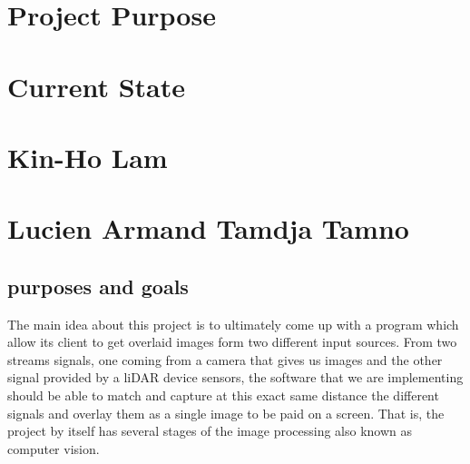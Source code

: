\documentclass[onecolumn, draftclsnofoot,10pt, compsoc]{IEEEtran}
\begin{document}
\begin{singlespace}

	\section{Project Purpose}
		
	\section{Current State}

	\section{Kin-Ho Lam}

	\section{Lucien Armand Tamdja Tamno}
		\subsection{ purposes and goals}
		The main idea about this project is to ultimately come up with a program which allow its client to get overlaid images form two different input sources. From two streams signals, one coming from a camera that gives us images and the other signal provided by a liDAR device sensors, the software that we are implementing should be able to match and capture at this exact same distance the different signals and overlay them as a single image to be paid on a screen. 
		That is, the project by itself has several stages of the image processing also known as computer vision.

\end{singlespace}
\end{document}
